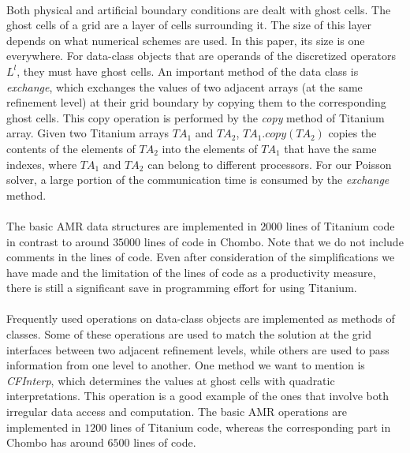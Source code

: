 \documentclass{ieee}
\numberwithin{equation}{section}
\begin{document}
\paragraph{}Both physical and artificial boundary conditions are dealt with ghost cells. The ghost cells of a grid are a layer of cells surrounding it. The size of this layer depends on what numerical schemes are used. In this paper, its size is one everywhere. For data-class objects that are operands of the discretized operators $L^l$, they must have ghost cells. An important method of the data class is {\it exchange}, which exchanges the values of two adjacent arrays (at the same refinement level) at their grid boundary by copying them to the corresponding ghost cells.  This copy operation is performed by the  {\it copy} method of Titanium array. Given two Titanium arrays $TA_1$ and $TA_2$, $TA_1.copy(TA_2)$ copies the contents of the elements of $TA_2$ into the elements of $TA_1$ that have the same indexes, where  $TA_1$ and $TA_2$ can belong to different  processors. For our Poisson solver, a large portion of the communication time is consumed by the {\it exchange} method. 

\paragraph{}The basic AMR data structures are implemented in $2000$ lines of Titanium code in contrast to around $35000$ lines of code in Chombo. Note that we do not include comments in the lines of code. Even after consideration of the simplifications we have made and the limitation of the lines of code as a productivity measure, there is still a significant save in programming effort for using Titanium.


\paragraph{}Frequently used operations on data-class objects are implemented as methods of classes. Some of these operations are used to match the solution at the grid interfaces between two adjacent refinement levels, while others are used to pass information from one level to another. One method we want to mention is {\it CFInterp}, which determines the values at ghost cells with quadratic interpretations. This operation is a good example of the ones that involve both irregular data access and computation. The basic AMR operations are implemented in $1200$ lines of Titanium code, whereas the corresponding part in Chombo has around $6500$ lines of code.
\end{document}
